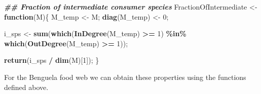 \documentclass[
]{article}
\newenvironment{Shaded}{\begin{snugshade}}{\end{snugshade}}
\newcommand{\ControlFlowTok}[1]{\textcolor[rgb]{0.13,0.29,0.53}{\textbf{#1}}}
\newcommand{\DecValTok}[1]{\textcolor[rgb]{0.00,0.00,0.81}{#1}}
\newcommand{\DocumentationTok}[1]{\textcolor[rgb]{0.56,0.35,0.01}{\textbf{\textit{#1}}}}
\newcommand{\FunctionTok}[1]{\textcolor[rgb]{0.13,0.29,0.53}{\textbf{#1}}}
\newcommand{\NormalTok}[1]{#1}
\newcommand{\OtherTok}[1]{\textcolor[rgb]{0.56,0.35,0.01}{#1}}
\newcommand{\SpecialCharTok}[1]{\textcolor[rgb]{0.81,0.36,0.00}{\textbf{#1}}}
\begin{document}
\begin{Shaded}
\begin{Highlighting}[]
\DocumentationTok{\#\# Fraction of intermediate consumer species}
\NormalTok{FractionOfIntermediate }\OtherTok{\textless{}{-}} \ControlFlowTok{function}\NormalTok{(M)\{}
\NormalTok{  M\_temp }\OtherTok{\textless{}{-}}\NormalTok{ M;}
  \FunctionTok{diag}\NormalTok{(M\_temp) }\OtherTok{\textless{}{-}} \DecValTok{0}\NormalTok{;}
  
\NormalTok{  i\_sps }\OtherTok{\textless{}{-}} \FunctionTok{sum}\NormalTok{(}\FunctionTok{which}\NormalTok{(}\FunctionTok{InDegree}\NormalTok{(M\_temp) }\SpecialCharTok{\textgreater{}=} \DecValTok{1}\NormalTok{) }\SpecialCharTok{\%in\%} \FunctionTok{which}\NormalTok{(}\FunctionTok{OutDegree}\NormalTok{(M\_temp) }\SpecialCharTok{\textgreater{}=} \DecValTok{1}\NormalTok{));}
  
  \FunctionTok{return}\NormalTok{(i\_sps }\SpecialCharTok{/} \FunctionTok{dim}\NormalTok{(M)[}\DecValTok{1}\NormalTok{]);}
\NormalTok{\}}
\end{Highlighting}
\end{Shaded}

For the Benguela food web we can obtain these properties using the
functions defined above.
\end{document}
